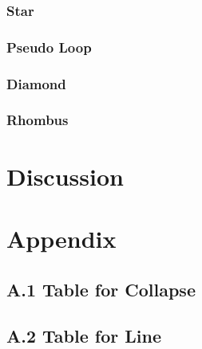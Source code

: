 \documentclass[12pt,a4paper,oneside]{book}
\theoremstyle{plain}
\theoremstyle{definition}
\theoremstyle{remark}
\theoremstyle{definition}
\numberwithin{equation}{chapter}
\begin{document}
\newpage{}
	
\subsection{Star}


\newpage{}

\subsection{Pseudo Loop}


\newpage{}

\subsection{Diamond}


\newpage{}

\subsection{Rhombus}






\chapter{Discussion}



\newpage{} %

\chapter*{Appendix}
\section*{A.1 Table for Collapse}


\newpage{}

\section*{A.2 Table for Line}


\newpage{}
\end{document}
